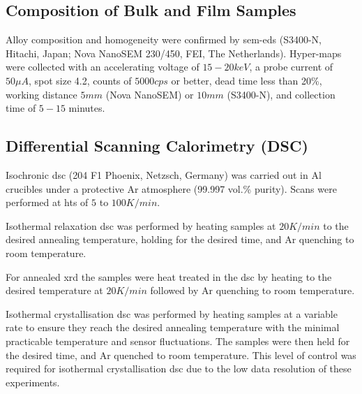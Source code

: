 \subsection{Composition of Bulk and Film Samples}
Alloy composition and homogeneity were confirmed by \acrshort{sem}-\acrshort{eds} (S3400-N, Hitachi, Japan; Nova NanoSEM 230/450, FEI, The Netherlands). Hyper-maps were collected with an accelerating voltage of $15-20keV$, a probe current of $50 \mu A$, spot size 4.2, counts of $5000cps$ or better, dead time less than 20\%, working distance $5mm$ (Nova NanoSEM) or $10mm$ (S3400-N), and collection time of $5-15$ minutes.

\subsection{Differential Scanning Calorimetry (DSC)}
Isochronic \gls{dsc} (204 F1 Phoenix, Netzsch, Germany) was carried out in Al crucibles under a protective Ar atmosphere (99.997 vol.\% purity). Scans were performed at \glspl{ht} of $5$ to $100 K/min$. 

Isothermal relaxation \acrshort{dsc} was performed by heating samples at $20 K/min$ to the desired annealing temperature, holding for the desired time, and Ar quenching to room temperature.

For annealed \acrshort{xrd} the samples were heat treated in the \acrshort{dsc} by heating to the desired temperature at $20 K/min$ followed by Ar quenching to room temperature.

Isothermal crystallisation \acrshort{dsc} was performed by heating samples at a variable rate to ensure they reach the desired annealing temperature with the minimal practicable temperature and sensor fluctuations. The samples were then held for the desired time, and Ar quenched to room temperature. This level of control was required for isothermal crystallisation \acrshort{dsc} due to the low data resolution of these experiments. 

